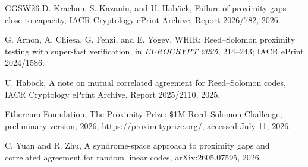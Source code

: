 \documentclass[11pt,a4paper]{amsart}
\numberwithin{equation}{section}
\theoremstyle{remark}
\begin{document}
\begin{thebibliography}{GGSW26}
D. Krachun, S. Kazanin, and U. Hab\"ock,
\newblock Failure of proximity gaps close to capacity,
\newblock IACR Cryptology ePrint Archive, Report 2026/782, 2026.

G. Arnon, A. Chiesa, G. Fenzi, and E. Yogev,
\newblock WHIR: Reed--Solomon proximity testing with super-fast verification,
\newblock in \emph{EUROCRYPT 2025}, 214--243;
IACR ePrint 2024/1586.

U. Hab\"ock,
\newblock A note on mutual correlated agreement for Reed--Solomon codes,
\newblock IACR Cryptology ePrint Archive, Report 2025/2110, 2025.

{Ethereum Foundation},
\newblock The Proximity Prize: \$1M Reed--Solomon Challenge,
\newblock preliminary version, 2026,
\newblock \url{https://proximityprize.org/}, accessed July 11, 2026.

C. Yuan and R. Zhu,
\newblock A syndrome-space approach to proximity gaps and correlated
agreement for random linear codes,
\newblock arXiv:2605.07595, 2026.

\end{thebibliography}
\end{document}

